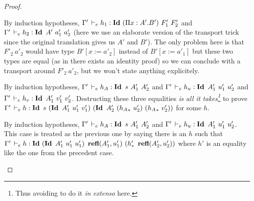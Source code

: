 \documentclass[a4paper,english]{lipics-utf8x}
\begin{document}
\begin{proof}
\begin{caselist}
      \begin{graycase}
        \begin{mathc}
        \end{mathc}
        By induction hypotheses,
        $\Gamma' \,\vdash_e h_1 : \operatorname{\mathbf{Id}~} (\Pi x:A'.B')\ F'_1\ F'_2$ and
        $\Gamma' \,\vdash_e h_2 : \operatorname{\mathbf{Id}~} A'\ a'_1\ a'_2$ (here we use an elaborate
        version of the transport trick since the original translation gives us
        $A'$ and $B'$).
        The only problem here is that $F'_2\ a'_2$ would have type
        $B'[x := a'_2]$ instead of $B'[x := a'_1]$ but these two types are equal
        (as in there exists an identity proof) so we can conclude with a
        transport around $F'_2\ a'_2$, but we won't state anything explicitely.
      \end{graycase}

      \begin{graycase}
        \begin{mathc}
        \end{mathc}
        By induction hypotheses, $\Gamma' \,\vdash_e h_A : \operatorname{\mathbf{Id}~} s\ A'_1\ A'_2$
        and $\Gamma' \,\vdash_e h_u : \operatorname{\mathbf{Id}~} A'_1\ u'_1\ u'_2$ and
        $\Gamma' \,\vdash_e h_v : \operatorname{\mathbf{Id}~} A'_1\ v'_1\ v'_2$.
        Destructing these three equalities \emph{is all it takes\footnote{Thus
        avoiding to do it \emph{in extenso} here.}} to prove
        $\Gamma' \dere h : \Id s\ (\Id A'_1\ u'_1\ v'_1)\ %
        (\Id A'_2\ ({h_A}_*\ u'_2)\ ({h_A}_*\ v'_2))$ for some $h$.
      \end{graycase}

      \begin{graycase}
        \begin{mathc}
        \end{mathc}
        By induction hypotheses, $\Gamma' \,\vdash_e h_A : \operatorname{\mathbf{Id}~} s\ A'_1\ A'_2$
        and $\Gamma' \,\vdash_e h_u : \operatorname{\mathbf{Id}~} A'_1\ u'_1\ u'_2$.
        This case is treated as the previous one by saying there is an $h$
        such that $\Gamma' \dere h : \Id (\Id A'_1\ u'_1\ u'_1)\ %
        \refl(A'_1,u'_1)\ (h'_*\ \refl(A'_2,u'_2))$ where $h'$ is an equality
        like the one from the precedent case.
      \end{graycase}


\end{caselist}
\end{proof}
\end{document}
